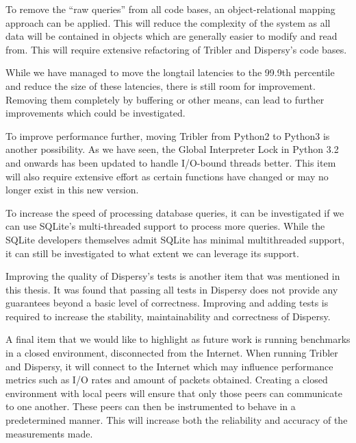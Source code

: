 To remove the \enquote{raw queries} from all code bases, an object-relational mapping approach can be applied.
This will reduce the complexity of the system as all data will be contained in objects which are generally easier to modify and read from.
This will require extensive refactoring of Tribler and Dispersy's code bases.

While we have managed to move the longtail latencies to the 99.9th percentile and reduce the size of these latencies, there is still room for improvement.
Removing them completely by buffering or other means, can lead to further improvements which could be investigated.

To improve performance further, moving Tribler from Python2 to Python3 is another possibility.
As we have seen, the Global Interpreter Lock in Python 3.2 and onwards has been updated to handle I/O-bound threads better.
This item will also require extensive effort as certain functions have changed or may no longer exist in this new version.

To increase the speed of processing database queries, it can be investigated if we can use SQLite's multi-threaded support to process more queries.
While the SQLite developers themselves admit SQLite has minimal multithreaded support, it can still be investigated to what extent we can leverage its support.

Improving the quality of Dispersy's tests is another item that was mentioned in this thesis.
It was found that passing all tests in Dispersy does not provide any guarantees beyond a basic level of correctness.
Improving and adding tests is required to increase the stability, maintainability and correctness of Dispersy.

A final item that we would like to highlight as future work is running benchmarks in a closed environment, disconnected from the Internet.
When running Tribler and Dispersy, it will connect to the Internet which may influence performance metrics such as I/O rates and amount of packets obtained.
Creating a closed environment with local peers will ensure that only those peers can communicate to one another.
These peers can then be instrumented to behave in a predetermined manner.
This will increase both the reliability and accuracy of the measurements made.
